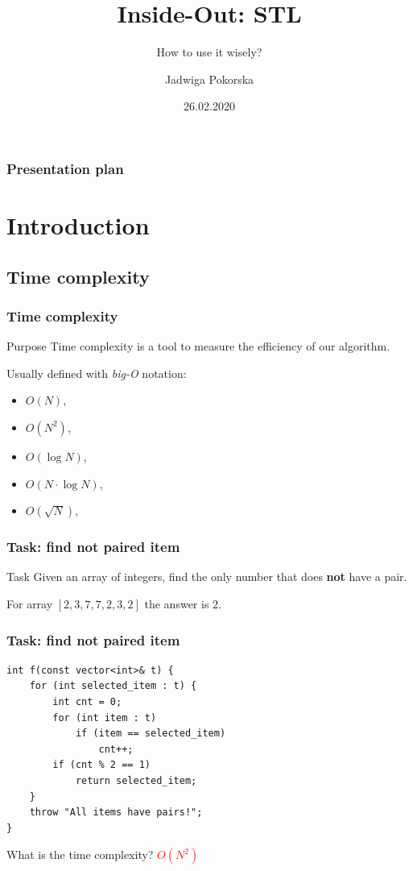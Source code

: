 \documentclass{beamer}
\title{Inside-Out: STL}
\subtitle{How to use it wisely?}
\author{Jadwiga Pokorska}
\institute{TietoEvry}
\date{26.02.2020}
\begin{document}

\begin{frame}
\titlepage
\end{frame}

\begin{frame}
\frametitle{Presentation plan}
\tableofcontents
\end{frame}

\section{Introduction}

\subsection{Time complexity}
\begin{frame}
    \frametitle{Time complexity}
    \begin{block}{Purpose}
    Time complexity is a tool to measure the efficiency of our algorithm.
    \end{block}

    \pause
    Usually defined with \textit{big-O} notation:
    \begin{itemize}
        \item $O(N)$,
        \item $O(N^2)$,
        \item $O(\log N)$,
        \item $O(N \cdot \log N)$,
        \item $O(\sqrt N)$,
    \end{itemize}
\end{frame}


\begin{frame}
    \frametitle{Task: find not paired item}
    \begin{block}{Task}
        Given an array of integers, find the only number that does \textbf{not}
        have a pair.
    \end{block}

    \pause
    \begin{example}
    For array $[2, 3, 7, 7, 2, 3, 2]$ the answer is $2$.
    \end{example}
\end{frame}

\begin{frame}[fragile]
    \frametitle{Task: find not paired item}
    \begin{verbatim}
int f(const vector<int>& t) {
    for (int selected_item : t) {
        int cnt = 0;
        for (int item : t)
            if (item == selected_item)
                cnt++;
        if (cnt % 2 == 1)
            return selected_item;
    }
    throw "All items have pairs!";
}\end{verbatim}

    \begin{block}{}
    What is the time complexity? \pause \textcolor{red}{$O(N^2)$}
    \end{block}
\end{frame}
\end{document}
